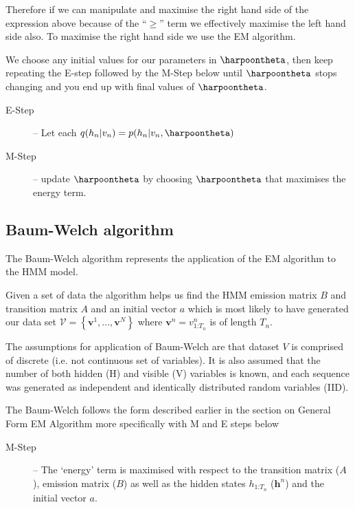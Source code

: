Therefore if we can manipulate and maximise the right hand side of the expression above because of the ``$\geq$'' term we effectively maximise the left hand side also. To maximise the right hand side we use the EM algorithm.

We choose any initial values for our parameters in $\harpoontheta$, then keep repeating the E-step followed by the M-Step below until $\harpoontheta$ stops changing and you end up with final values of $\harpoontheta$.

\begin{description}
    \item[E-Step] -- Let each $q(h_n|v_n) = p ( h_n | v_n,\harpoontheta )$
    \item[M-Step] -- update $\harpoontheta$ by choosing $\harpoontheta$ that maximises the energy term.
\end{description}

\subsection{Baum-Welch algorithm}

The Baum-Welch algorithm \autocite{baum1970maximization} represents the application of the EM algorithm to the HMM model.

Given a set of data the algorithm helps us find the HMM emission matrix $B$ and transition matrix $A$ and an initial vector $a$ which is most likely to have generated our data set 
$\mathcal{V}=\left\{\mathbf{v}^1,\dots,\mathbf{v}^N\right\}$
where
$\mathbf{v}^n = v^{n}_{1\text{:$T_n$}}$ is of length $T_n$.

The assumptions for application of Baum-Welch are that dataset $V$ is comprised of discrete (i.e. not continuous set of variables). It is also assumed that the number of both hidden (H) and visible (V) variables is known, and each sequence was generated as independent and identically distributed random variables (IID).

The Baum-Welch follows the form described earlier in the section on General Form EM Algorithm more specifically with M and E steps below \autocite{barberBRML2012}

\begin{description}
    \item[M-Step] -- The `energy' term is maximised with respect to the transition matrix ($A$), emission matrix ($B$) as well as the hidden states $h_{1\text{:$T_n$}}$ ($\mathbf{h}^n$) and the initial vector $a$.
\end{description}

